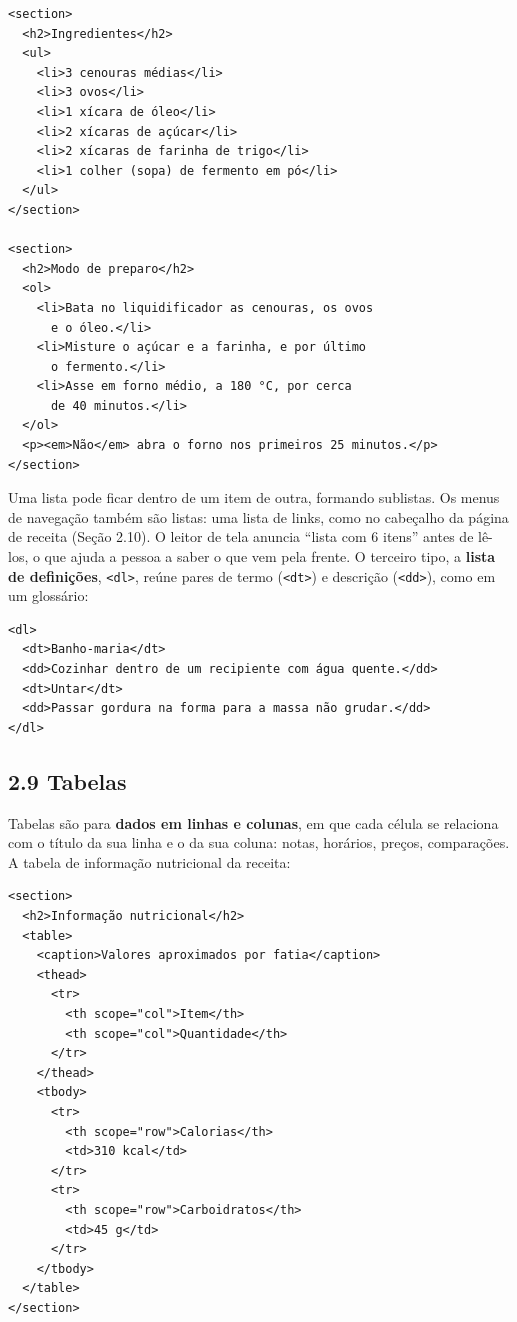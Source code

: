 \begin{codigo}
\begin{Verbatim}[breaklines=true, breaksymbolleft={}, fontsize=\footnotesize]
<section>
  <h2>Ingredientes</h2>
  <ul>
    <li>3 cenouras médias</li>
    <li>3 ovos</li>
    <li>1 xícara de óleo</li>
    <li>2 xícaras de açúcar</li>
    <li>2 xícaras de farinha de trigo</li>
    <li>1 colher (sopa) de fermento em pó</li>
  </ul>
</section>

<section>
  <h2>Modo de preparo</h2>
  <ol>
    <li>Bata no liquidificador as cenouras, os ovos
      e o óleo.</li>
    <li>Misture o açúcar e a farinha, e por último
      o fermento.</li>
    <li>Asse em forno médio, a 180 °C, por cerca
      de 40 minutos.</li>
  </ol>
  <p><em>Não</em> abra o forno nos primeiros 25 minutos.</p>
</section>
\end{Verbatim}
\end{codigo}

Uma lista pode ficar dentro de um item de outra, formando sublistas. Os menus de navegação também são listas: uma lista de links, como no cabeçalho da página de receita (Seção 2.10). O leitor de tela anuncia ``lista com 6 itens'' antes de lê-los, o que ajuda a pessoa a saber o que vem pela frente. O terceiro tipo, a \textbf{lista de definições}, \texttt{<dl>}, reúne pares de termo (\texttt{<dt>}) e descrição (\texttt{<dd>}), como em um glossário:

\begin{codigo}
\begin{Verbatim}[breaklines=true, breaksymbolleft={}, fontsize=\footnotesize]
<dl>
  <dt>Banho-maria</dt>
  <dd>Cozinhar dentro de um recipiente com água quente.</dd>
  <dt>Untar</dt>
  <dd>Passar gordura na forma para a massa não grudar.</dd>
</dl>
\end{Verbatim}
\end{codigo}

\subsection{2.9 Tabelas}

Tabelas são para \textbf{dados em linhas e colunas}, em que cada célula se relaciona com o título da sua linha e o da sua coluna: notas, horários, preços, comparações. A tabela de informação nutricional da receita:

\begin{codigo}
\begin{Verbatim}[breaklines=true, breaksymbolleft={}, fontsize=\footnotesize]
<section>
  <h2>Informação nutricional</h2>
  <table>
    <caption>Valores aproximados por fatia</caption>
    <thead>
      <tr>
        <th scope="col">Item</th>
        <th scope="col">Quantidade</th>
      </tr>
    </thead>
    <tbody>
      <tr>
        <th scope="row">Calorias</th>
        <td>310 kcal</td>
      </tr>
      <tr>
        <th scope="row">Carboidratos</th>
        <td>45 g</td>
      </tr>
    </tbody>
  </table>
</section>
\end{Verbatim}
\end{codigo}

